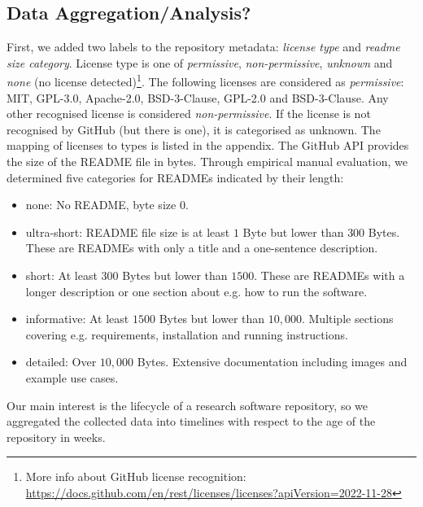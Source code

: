\documentclass[10pt,a4paper]{scrartcl}
\begin{document}
\subsection*{Data Aggregation/Analysis?}

First, we added two labels to the repository metadata: \textit{license type} and \textit{readme size category}.
License type is one of \textit{permissive}, \textit{non-permissive}, \textit{unknown} and \textit{none} (no license detected)\footnote{More info about GitHub license recognition: \url{https://docs.github.com/en/rest/licenses/licenses?apiVersion=2022-11-28}}.
The following licenses are considered as \textit{permissive}: MIT, GPL-3.0, Apache-2.0, BSD-3-Clause, GPL-2.0 and BSD-3-Clause.
Any other recognised license is considered \textit{non-permissive}.
If the license is not recognised by GitHub (but there is one), it is categorised as unknown.
The mapping of licenses to types is listed in the appendix.
The GitHub API provides the size of the README file in bytes.
Through empirical manual evaluation, we determined five categories for READMEs indicated by their length:
\begin{itemize}
    \item none: No README, byte size $0$.
    \item ultra-short: README file size is at least $1$ Byte but lower than $300$ Bytes. These are READMEs with only a title and a one-sentence description.
    \item short: At least $300$ Bytes but lower than $1500$. These are READMEs with a longer description or one section about e.g. how to run the software.
    \item informative: At least $1500$ Bytes but lower than $10,000$. Multiple sections covering e.g. requirements, installation and running instructions.
    \item detailed: Over $10,000$ Bytes. Extensive documentation including images and example use cases.
\end{itemize}

Our main interest is the lifecycle of a research software repository, so we aggregated the collected data into timelines
with respect to the age of the repository in weeks.
\end{document}
